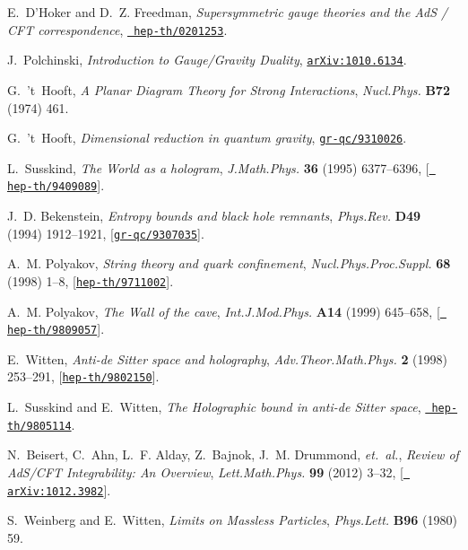 \documentclass[12pt,a4paper]{article}
\begin{document}
\begin{thebibliography}{100}
E.~D'Hoker and D.~Z. Freedman, {\it {Supersymmetric gauge theories and the AdS
  / CFT correspondence}},  \href{http://xxx.lanl.gov/abs/hep-th/0201253}{{\tt
  hep-th/0201253}}.

J.~Polchinski, {\it {Introduction to Gauge/Gravity Duality}},
  \href{http://xxx.lanl.gov/abs/1010.6134}{{\tt arXiv:1010.6134}}.

G.~'t~Hooft, {\it {A Planar Diagram Theory for Strong Interactions}},  {\em
  Nucl.Phys.} {\bf B72} (1974) 461.

G.~'t~Hooft, {\it {Dimensional reduction in quantum gravity}},
  \href{http://xxx.lanl.gov/abs/gr-qc/9310026}{{\tt gr-qc/9310026}}.

L.~Susskind, {\it {The World as a hologram}},  {\em J.Math.Phys.} {\bf 36}
  (1995) 6377--6396, [\href{http://xxx.lanl.gov/abs/hep-th/9409089}{{\tt
  hep-th/9409089}}].

J.~D. Bekenstein, {\it {Entropy bounds and black hole remnants}},  {\em
  Phys.Rev.} {\bf D49} (1994) 1912--1921,
  [\href{http://xxx.lanl.gov/abs/gr-qc/9307035}{{\tt gr-qc/9307035}}].

A.~M. Polyakov, {\it {String theory and quark confinement}},  {\em
  Nucl.Phys.Proc.Suppl.} {\bf 68} (1998) 1--8,
  [\href{http://xxx.lanl.gov/abs/hep-th/9711002}{{\tt hep-th/9711002}}].

A.~M. Polyakov, {\it {The Wall of the cave}},  {\em Int.J.Mod.Phys.} {\bf A14}
  (1999) 645--658, [\href{http://xxx.lanl.gov/abs/hep-th/9809057}{{\tt
  hep-th/9809057}}].

E.~Witten, {\it {Anti-de Sitter space and holography}},  {\em
  Adv.Theor.Math.Phys.} {\bf 2} (1998) 253--291,
  [\href{http://xxx.lanl.gov/abs/hep-th/9802150}{{\tt hep-th/9802150}}].

L.~Susskind and E.~Witten, {\it {The Holographic bound in anti-de Sitter
  space}},  \href{http://xxx.lanl.gov/abs/hep-th/9805114}{{\tt
  hep-th/9805114}}.

N.~Beisert, C.~Ahn, L.~F. Alday, Z.~Bajnok, J.~M. Drummond, {\em et.~al.}, {\it
  {Review of AdS/CFT Integrability: An Overview}},  {\em Lett.Math.Phys.} {\bf
  99} (2012) 3--32, [\href{http://xxx.lanl.gov/abs/1012.3982}{{\tt
  arXiv:1012.3982}}].

S.~Weinberg and E.~Witten, {\it {Limits on Massless Particles}},  {\em
  Phys.Lett.} {\bf B96} (1980) 59.


\end{thebibliography}
\end{document}
